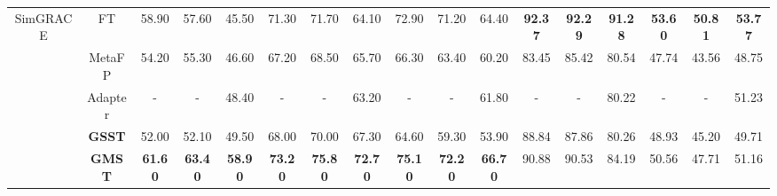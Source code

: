\begin{table*}[h]
\begin{center}
{\begin{tabular}{cc|ccc|ccc|ccc|ccc|ccc}
\multicolumn{1}{c|}{\multirow{5}{*}{SimGRACE}} & FT & 58.90 & 57.60 & 45.50 & 71.30 & 71.70 & 64.10 & 72.90& 71.20 & 64.40 & \textbf{92.37} & \textbf{92.29} & \textbf{91.28}  & \textbf{53.60}& \textbf{50.81}&\textbf{53.77}\\
\multicolumn{1}{c|}{} & MetaFP & 54.20& 55.30& 46.60& 67.20& 68.50& 65.70& 66.30& 63.40& 60.20& 83.45& 85.42& 80.54& 47.74& 43.56&48.75\\
\multicolumn{1}{c|}{} & Adapter & -& -& 48.40& -& -& 63.20& -& -& 61.80& -& -& 80.22& -& -&51.23\\
\multicolumn{1}{c|}{} & \textbf{GSST} & 52.00  & 52.10 & 49.50& 68.00  & 70.00   & 67.30 & 64.60 & 59.30 & 53.90 & 88.84 & 87.86 & 80.26  & 48.93& 45.20&49.71\\
\multicolumn{1}{c|}{} & \textbf{GMST} & \textbf{61.60} & \textbf{63.40} & \textbf{58.90} & \textbf{73.20} & \textbf{75.80} & \textbf{72.70} & \textbf{75.10} & \textbf{72.20} & \textbf{66.70} & 90.88 & 90.53 & 84.19  & 50.56& 47.71&51.16\\ 
\hline \hline
\end{tabular}}
  \end{center}
  \label{middle_sota}
  \vspace{-6mm}
  \end{table*}